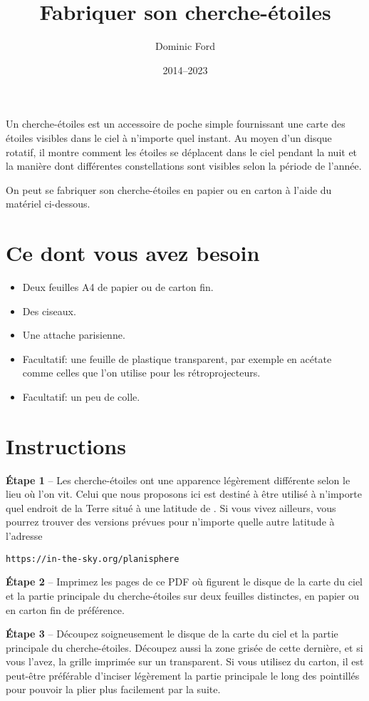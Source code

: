 \documentclass[a4paper,onecolumn,10pt]{article}
\title{Fabriquer son cherche-étoiles}
\author{Dominic Ford}
\date{2014--2023}
\begin{document}
\maketitle
\setcounter{footnote}{1}

Un cherche-étoiles est un accessoire de poche simple fournissant une carte des étoiles visibles dans le ciel à n’importe quel instant. Au moyen d’un disque rotatif, il montre comment les étoiles se déplacent dans le ciel pendant la nuit et la manière dont différentes constellations sont visibles selon la période de l’année.

On peut se fabriquer son cherche-étoiles en papier ou en carton à l’aide du matériel ci-dessous.

\section*{Ce dont vous avez besoin}

\begin{itemize}
\item Deux feuilles A4 de papier ou de carton fin.
\item Des ciseaux.
\item Une attache parisienne.
\item Facultatif: une feuille de plastique transparent, par exemple en acétate comme celles que l’on utilise pour les rétroprojecteurs.
\item Facultatif: un peu de colle.
\end{itemize}

\section*{Instructions}

{\bf Étape 1} -- Les cherche-étoiles ont une apparence légèrement différente selon le lieu où l’on vit. Celui que nous proposons ici est destiné à être utilisé à n’importe quel endroit de la Terre situé à une latitude de . Si vous vivez ailleurs, vous pourrez trouver des versions prévues pour n’importe quelle autre latitude à l’adresse

\centerline{\tt https://in-the-sky.org/planisphere}

{\bf Étape 2} -- Imprimez les pages de ce PDF où figurent le disque de la carte du ciel et la partie principale du cherche-étoiles sur deux feuilles distinctes, en papier ou en carton fin de préférence.

{\bf Étape 3} -- Découpez soigneusement le disque de la carte du ciel et la partie principale du cherche-étoiles. Découpez aussi la zone grisée de cette dernière, et si vous l’avez, la grille imprimée sur un transparent. Si vous utilisez du carton, il est peut-être préférable d’inciser légèrement la partie principale le long des pointillés pour pouvoir la plier plus facilement par la suite.
\end{document}
